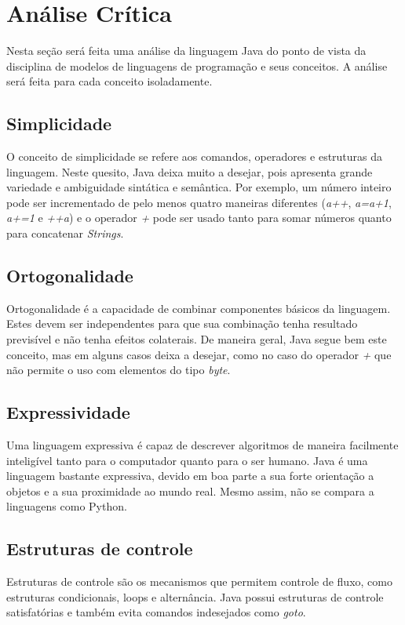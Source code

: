\documentclass[12pt]{article}
\begin{document}
\section{Análise Crítica}
Nesta seção será feita uma análise da linguagem Java do ponto de vista da disciplina de modelos de linguagens de programação e seus conceitos. A análise será feita para cada conceito isoladamente.

\subsection{Simplicidade}
O conceito de simplicidade se refere aos comandos, operadores e estruturas da linguagem. Neste quesito, Java deixa muito a desejar, pois apresenta grande variedade e ambiguidade sintática e semântica. Por exemplo, um número inteiro pode ser incrementado de pelo menos quatro maneiras diferentes (\textit{a++}, \textit{a=a+1}, \textit{a+=1} e \textit{++a}) e o operador \textit{+} pode ser usado tanto para somar números quanto para concatenar \textit{Strings}.

\subsection{Ortogonalidade}
Ortogonalidade é a capacidade de combinar componentes básicos da linguagem. Estes devem ser independentes para que sua combinação tenha resultado previsível e não tenha efeitos colaterais. De maneira geral, Java segue bem este conceito, mas em alguns casos deixa a desejar, como no caso do operador \textit{+} que não permite o uso com elementos do tipo \textit{byte}.

\subsection{Expressividade}
Uma linguagem expressiva é capaz de descrever algoritmos de maneira facilmente inteligível tanto para o computador quanto para o ser humano. Java é uma linguagem bastante expressiva, devido em boa parte a sua forte orientação a objetos e a sua proximidade ao mundo real. Mesmo assim, não se compara a linguagens como Python.

\subsection{Estruturas de controle}
Estruturas de controle são os mecanismos que permitem controle de fluxo, como estruturas condicionais, loops e alternância. Java possui estruturas de controle satisfatórias e também evita comandos indesejados como \textit{goto}.
\end{document}
